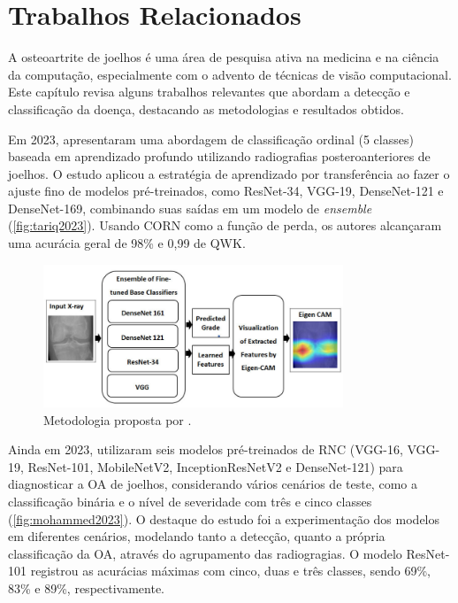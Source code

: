 \chapter{Trabalhos Relacionados}\label{cap:trab_relacionados}

A osteoartrite de joelhos é uma área de pesquisa ativa na medicina e na ciência da computação, especialmente com o advento de técnicas de visão computacional. Este capítulo revisa alguns trabalhos relevantes que abordam a detecção e classificação da doença, destacando as metodologias e resultados obtidos.

Em 2023,  apresentaram uma abordagem de classificação ordinal (5 classes) baseada em aprendizado profundo utilizando radiografias posteroanteriores de joelhos. O estudo aplicou a estratégia de aprendizado por transferência ao fazer o ajuste fino de modelos pré-treinados, como ResNet-34, VGG-19, DenseNet-121 e DenseNet-169, combinando suas saídas em um modelo de \textit{ensemble} (\autoref{fig:tariq2023}). Usando CORN como a função de perda, os autores alcançaram uma acurácia geral de 98\% e 0,99 de QWK.

\begin{figure}[ht]
    \centering
    \includegraphics[width=0.8\textwidth]{figs/tariq2023.png}
    \caption{Metodologia proposta por .}
    \label{fig:tariq2023}
\end{figure}

Ainda em 2023,  utilizaram seis modelos pré-treinados de RNC (VGG-16, VGG-19, ResNet-101, MobileNetV2, InceptionResNetV2 e DenseNet-121) para diagnosticar a OA de joelhos, considerando vários cenários de teste, como a classificação binária e o nível de severidade com três e cinco classes (\autoref{fig:mohammed2023}). O destaque do estudo foi a experimentação dos modelos em diferentes cenários, modelando tanto a detecção, quanto a própria classificação da OA, através do agrupamento das radiogragias. O modelo ResNet-101 registrou as acurácias máximas com cinco, duas e três classes, sendo 69\%, 83\% e 89\%, respectivamente.

